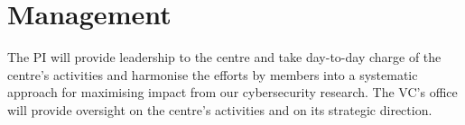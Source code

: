 \documentclass[11pt]{article}
\begin{document}
    \section{Management}
    The PI will provide leadership to the centre and take day-to-day
    charge of the centre's activities and harmonise the efforts by
    members into a systematic approach for maximising impact from our
    cybersecurity research.  The VC's office will provide oversight on
    the centre's activities and on its strategic direction.

    
\end{document}

